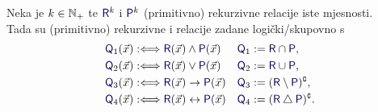 \begin{propozicija}[{name=[logički veznici čuvaju (primitivnu) rekurzivnost]}]\label{prop:vezn}
Neka je $k\in{\mathbb N}_+$ te $\f R^k$ i $\f P^k$ (primitivno) rekurzivne relacije iste mjesnosti.\\ Tada su (primitivno) rekurzivne i relacije zadane logički\slash skupovno s
\begin{align}
    \f Q_1(\vec x)&:\Longleftrightarrow\f R(\vec x)\land\f P(\vec x)
    &
    \f Q_1 &:=\f R \cap\f P\text,
    \\
    \f Q_2(\vec x)&:\Longleftrightarrow\f R(\vec x)\lor\f P(\vec x)
    &
    \f Q_2 &:=\f R \cup\f P\text,
    \\
    \f Q_3(\vec x)&:\Longleftrightarrow\f R(\vec x)\to\f P(\vec x)
    &
    \f Q_3 &:=(\f R\setminus\f P)\kompl\text,
    \\
    \f Q_4(\vec x)&:\Longleftrightarrow\f R(\vec x)\leftrightarrow\f P(\vec x)
    &
    \f Q_4 &:=(\f R\mathbin\triangle\f P)\kompl\text.
\end{align}
\end{propozicija}
